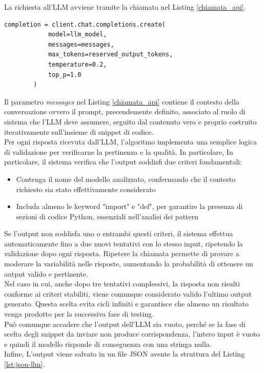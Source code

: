 \documentclass{article}
\begin{document}
La richiesta all'LLM avviene tramite la chiamata nel Listing \ref{chiamata_api}.
\begin{lstlisting}[caption={Chiamata API}, label={chiamata_api}]
        completion = client.chat.completions.create(
            model=llm_model,
            messages=messages,
            max_tokens=reserved_output_tokens,
            temperature=0.2, 
            top_p=1.0
        )
\end{lstlisting}
Il parametro \textit{messages} nel Listing \ref{chiamata_api} contiene il contesto della conversazione ovvero il prompt, precendemente definito, associato al ruolo di sistema che l'LLM deve assumere, seguito dal contenuto vero e proprio costruito iterativamente sull'insieme di snippet di codice.\\
Per ogni risposta ricevuta dall'LLM, l'algoritmo implementa una semplice logica di validazione per verificarne la pertinenza e la qualità. In particolare, In particolare, il sistema verifica che l'output soddisfi due criteri fondamentali:
\begin{itemize}
    \item Contenga il nome del modello analizzato, confermando che il contesto richiesto sia stato effettivamente considerato
    \item Includa almeno le keyword "import" e "def", per garantire la presenza di sezioni di codice Python, essenziali nell'analisi dei pattern
\end{itemize}
Se l'output non soddisfa uno o entrambi questi criteri, il sistema effettua automaticamente fino a due nuovi tentativi con lo stesso input, ripetendo la validazione dopo ogni risposta. Ripetere la chiamata permette di provare a moderare la variabilità nelle risposte, aumentando la probabilità di ottenere un output valido e pertinente.\\ 
Nel caso in cui, anche dopo tre tentativi complessivi, la risposta non risulti conforme ai criteri stabiliti, viene comunque considerato valido l'ultimo output generato. Questa scelta evita cicli infiniti e garantisce che almeno un risultato venga prodotto per la successiva fase di testing. \\
Può comunque accadere che l'output dell'LLM sia vuoto, perché se la fase di scelta degli snippet da inviare non produce corrispondenza, l'intero input è vuoto e quindi il modello risponde di conseguenza con una stringa nulla.\\
Infine, L’output viene salvato in un file JSON avente la struttura del Listing \ref{lst:json-llm}.
\end{document}

